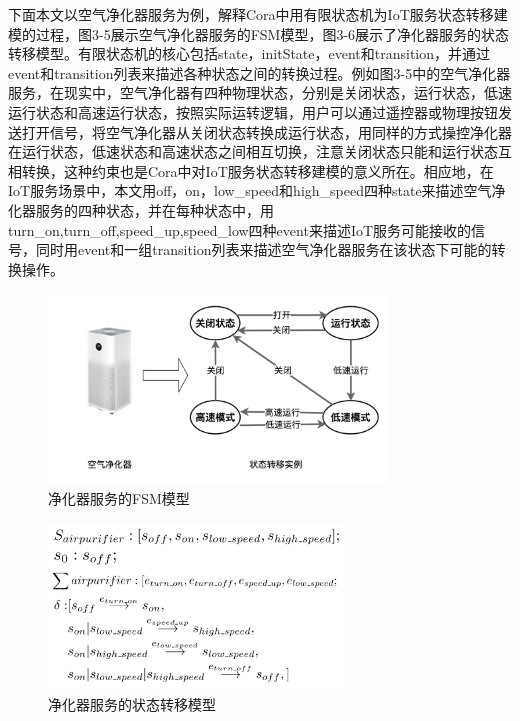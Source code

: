\documentclass[winfonts,master,twoside]{njuthesis}
\begin{document}
下面本文以空气净化器服务为例，解释Cora中用有限状态机为IoT服务状态转移建模的过程，图3-5展示空气净化器服务的FSM模型，图3-6展示了净化器服务的状态转移模型。有限状态机的核心包括state，initState，event和transition，并通过event和transition列表来描述各种状态之间的转换过程\cite{scxml}。例如图3-5中的空气净化器服务，在现实中，空气净化器有四种物理状态，分别是关闭状态，运行状态，低速运行状态和高速运行状态，按照实际运转逻辑，用户可以通过遥控器或物理按钮发送打开信号，将空气净化器从关闭状态转换成运行状态，用同样的方式操控净化器在运行状态，低速状态和高速状态之间相互切换，注意关闭状态只能和运行状态互相转换，这种约束也是Cora中对IoT服务状态转移建模的意义所在。相应地，在IoT服务场景中，本文用off，on，low\_speed和high\_speed四种state来描述空气净化器服务的四种状态，并在每种状态中，用turn\_on,turn\_off,speed\_up,speed\_low四种event来描述IoT服务可能接收的信号，同时用event和一组transition列表来描述空气净化器服务在该状态下可能的转换操作。
\begin{figure}
	\centering
	\includegraphics[width=0.8\textwidth]{figure/3-model-driven/fsm_for_airpurifier_1.png}
	\caption{净化器服务的FSM模型}
	\label{ontransact-impl}
\end{figure}
\begin{figure}
	\centering
	\includegraphics[width=0.7\textwidth]{figure/3-model-driven/fsm_for_airpurifier_2.png}
	\caption{净化器服务的状态转移模型}
	\label{ontransact-impl}
\end{figure}
\end{document}
